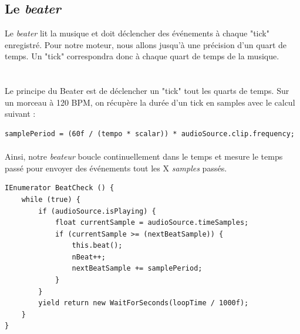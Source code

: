 \subsection{Le \textit{beater}}
Le \textit{beater} lit la musique et doit déclencher des événements à chaque "tick" enregistré. Pour notre moteur, nous allons jusqu'à une précision d'un quart de temps. Un "tick" correspondra donc à chaque quart de temps de la musique.\\

\\\\

Le principe du Beater est de déclencher un "tick" tout les quarts de temps. Sur un morceau à 120 BPM, on récupère la durée d’un tick en samples avec le calcul suivant :

\begin{lstlisting}
samplePeriod = (60f / (tempo * scalar)) * audioSource.clip.frequency;
\end{lstlisting}

\paragraph{}

Ainsi, notre \textit{beateur} boucle continuellement dans le temps et mesure le temps passé pour envoyer des événements tout les X \textit{samples} passés.

\begin{lstlisting}
IEnumerator BeatCheck () {
    while (true) {
        if (audioSource.isPlaying) {
            float currentSample = audioSource.timeSamples;
            if (currentSample >= (nextBeatSample)) {
                this.beat();
                nBeat++;
                nextBeatSample += samplePeriod;
            }
        }
        yield return new WaitForSeconds(loopTime / 1000f);
    }
}
\end{lstlisting}


